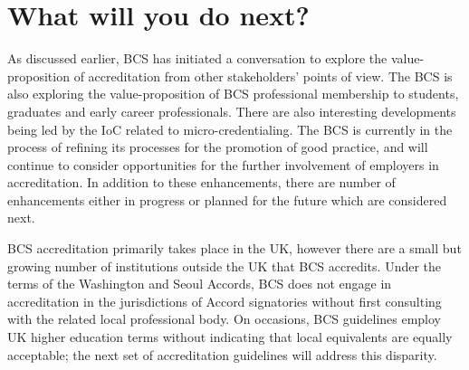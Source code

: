 \documentclass[sigconf]{acmart}
\begin{document}
\section {What will you do next?}	

As discussed earlier, BCS has initiated a conversation to explore the
value-proposition of accreditation from other stakeholders' points of
view. The BCS is also exploring the value-proposition of BCS
professional membership to students, graduates and early career
professionals.  There are also interesting developments being led by
the IoC related to micro-credentialing. The BCS is currently in the
process of refining its processes for the promotion of good practice,
and will continue to consider opportunities for the further
involvement of employers in accreditation. In addition to these
enhancements, there are number of enhancements either in progress or
planned for the future which are considered next.

BCS accreditation primarily takes place in the UK, however there are a
small but growing number of institutions outside the UK that BCS
accredits. Under the terms of the Washington and Seoul Accords, BCS
does not engage in accreditation in the jurisdictions of Accord
signatories without first consulting with the related local
professional body.  On occasions, BCS guidelines employ UK higher
education terms without indicating that local equivalents are equally
acceptable; the next set of accreditation guidelines will address this
disparity.
\end{document}

